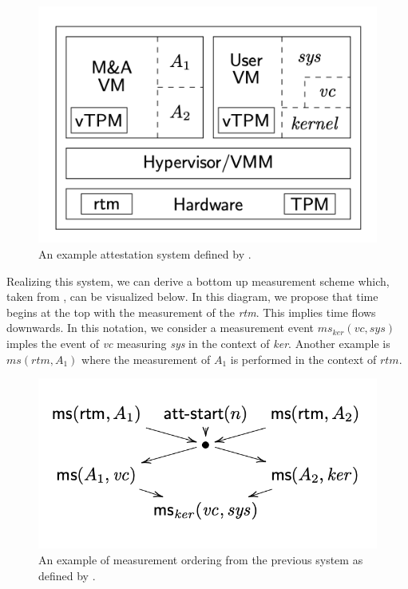\documentclass[12pt, letterpaper]{article}
\begin{document}
\begin{figure}[hbtp]
  \centering
  \includegraphics[scale=.5]{AttSystemRowe.png}
  \caption{An example attestation system defined by \cite{Rowe::Bundling}.}
  \label{att-system-rowe}
\end{figure}

Realizing this system, we can derive a bottom up measurement scheme which, taken from \cite{Rowe::Bundling}, can be visualized below. In this diagram, we propose that time begins at the top with the measurement of  the \emph{rtm}. This implies time flows downwards. In this notation, we consider a measurement event $ms_{ker}(vc,sys)$ imples the event of \emph{vc} measuring \emph{sys} in the context of \emph{ker}. Another example is $ms(rtm,A_1)$ where the measurement of $A_1$ is performed in the context of $rtm$. 

\begin{figure}[hbtp]
  \centering
  \includegraphics[scale=.5]{MeasOrdRowe.png}
  \caption{An example of measurement ordering from the previous system as defined by \cite{Rowe::Bundling}.}
  \label{meas-ord-rowe}
\end{figure}
\end{document}
